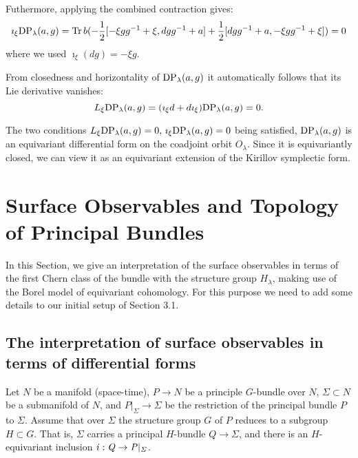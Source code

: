 \documentclass[11pt]{report}
\theoremstyle{plain}
\theoremstyle{definition}
\theoremstyle{remark}
\theoremstyle{remark}
\numberwithin{equation}{section}
\begin{document}
Futhermore, applying the combined contraction gives:
%
\begin{equation}
\imath_{\xi} {\rm DP}_\lambda(a,g) = {\rm Tr} \, b (  - \frac{1}{2} [-\xi g g^{-1} + \xi , dg g^{-1} + a] + \frac{1}{2} [dg g^{-1} + a , - \xi g g^{-1} + \xi] ) = 0
\end{equation}
where we used $\imath_{\xi}(dg) = -\xi g$.

From closedness and horizontality of ${\rm DP}_\lambda(a,g)$ it automatically follows that its Lie derivative vanishes:
%
\begin{equation}
L_{\xi} {\rm DP}_\lambda(a,g) = (\imath_{\xi} d + d \imath_{\xi}) {\rm DP}_\lambda(a,g) = 0.
\end{equation}

 The two conditions $L_{\xi} {\rm DP}_\lambda(a,g) = 0, \, \imath_{\xi} {\rm DP}_\lambda(a,g) = 0$ being satisfied,  ${\rm DP}_\lambda(a,g)$ is an equivariant differential form on the coadjoint orbit $O_\lambda$.  Since it is equivariantly closed, we can view it as an equivariant extension of the Kirillov symplectic form.







\section{Surface Observables and Topology of Principal Bundles}


In this Section, we give an interpretation of the surface observables in terms of the first Chern class of the bundle with the structure group $H_\lambda$, making use of the Borel model of equivariant cohomology. 
For this purpose we need to add some details to our initial setup of Section 3.1. 

\subsection{The interpretation of surface observables in terms of differential forms} \label{5.1}
Let $N$ be a manifold (space-time), $P\to N$ be a principle $G$-bundle over $N$, 
$\Sigma \subset N$ be a submanifold of $N$,  and $P|_\Sigma \to \Sigma$ be the restriction of the principal bundle $P$ to $\Sigma$. Assume that over $\Sigma$ the structure group $G$ of $P$ reduces to a subgroup $H \subset G$. That is, $\Sigma$ carries a principal $H$-bundle $Q \to \Sigma$, and there is an $H$-equivariant inclusion $ \it{i}: Q \to P|_\Sigma$. 
\end{document}
